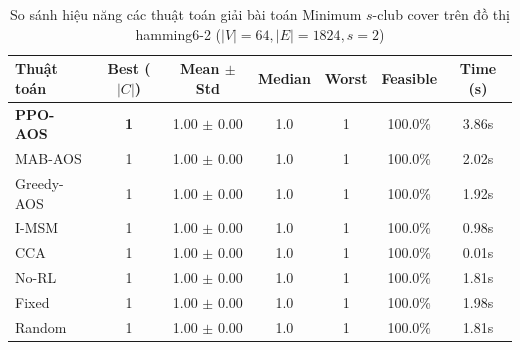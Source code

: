 \begin{table}[htbp]
\centering
\caption{So sánh hiệu năng các thuật toán giải bài toán Minimum $s$-club cover trên đồ thị hamming6-2 ($|V|=64, |E|=1824, s=2$)}
\label{tab:results_hamming6_2}
\begin{tabular}{lcccccc}
\hline
\textbf{Thuật toán} & \textbf{Best ($|C|$)} & \textbf{Mean $\pm$ Std} & \textbf{Median} & \textbf{Worst} & \textbf{Feasible} & \textbf{Time (s)} \\
\hline
\textbf{PPO-AOS} & \textbf{1} & 1.00 $\pm$ 0.00 & 1.0 & 1 & 100.0\% & 3.86s \\
MAB-AOS & 1 & 1.00 $\pm$ 0.00 & 1.0 & 1 & 100.0\% & 2.02s \\
Greedy-AOS & 1 & 1.00 $\pm$ 0.00 & 1.0 & 1 & 100.0\% & 1.92s \\
I-MSM & 1 & 1.00 $\pm$ 0.00 & 1.0 & 1 & 100.0\% & 0.98s \\
CCA & 1 & 1.00 $\pm$ 0.00 & 1.0 & 1 & 100.0\% & 0.01s \\
No-RL & 1 & 1.00 $\pm$ 0.00 & 1.0 & 1 & 100.0\% & 1.81s \\
Fixed & 1 & 1.00 $\pm$ 0.00 & 1.0 & 1 & 100.0\% & 1.98s \\
Random & 1 & 1.00 $\pm$ 0.00 & 1.0 & 1 & 100.0\% & 1.81s \\
\hline
\end{tabular}
\end{table}
